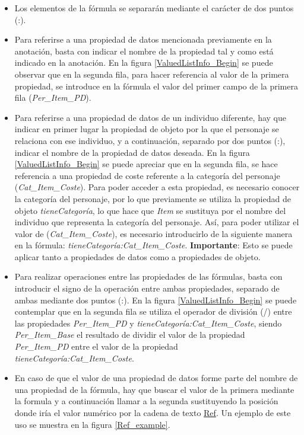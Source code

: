 \begin{itemize}
    \item Los elementos de la fórmula se separarán mediante el carácter de dos puntos (:).
    
    \item Para referirse a una propiedad de datos mencionada previamente en la anotación, basta con indicar el nombre de la 
    propiedad tal y como está indicado en la anotación. En la figura \ref*{ValuedListInfo_Begin} se puede observar que 
    en la segunda fila, para hacer referencia al valor de la primera propiedad, se introduce en la fórmula el valor del 
    primer campo de la primera fila (\textit{Per\_Item\_PD}).

    \item Para referirse a una propiedad de datos de un individuo diferente, hay que indicar en primer lugar la propiedad 
    de objeto por la que el personaje se relaciona con ese individuo, y a continuación, separado por dos puntos (:), indicar 
    el nombre de la propiedad de datos deseada. En la figura \ref*{ValuedListInfo_Begin} se puede apreciar que en la segunda 
    fila, se hace referencia a una propiedad de coste referente a la categoría del personaje (\textit{Cat\_Item\_Coste}).
    Para poder acceder a esta propiedad, es necesario conocer la categoría del personaje, por lo que previamente se utiliza 
    la propiedad de objeto \textit{tieneCategoría}, lo que hace que \textit{Item} se sustituya por el nombre del individuo que 
    representa la categoría del personaje. Así, para poder utilizar el valor de (\textit{Cat\_Item\_Coste}), es necesario introducirlo 
    de la siguiente manera en la fórmula: \textit{tieneCategoría:Cat\_Item\_Coste}. \textbf{Importante}: Esto se puede aplicar tanto 
    a propiedades de datos como a propiedades de objeto.

    \item Para realizar operaciones entre las propiedades de las fórmulas, basta con introducir el signo de la operación entre ambas 
    propiedades, separado de ambas mediante dos puntos (:). En la figura \ref*{ValuedListInfo_Begin} se puede contemplar que en la 
    segunda fila se utiliza el operador de división (/) entre las propiedades \textit{Per\_Item\_PD} y 
    \textit{tieneCategoría:Cat\_Item\_Coste}, siendo \textit{Per\_Item\_Base} el resultado de dividir el valor de la propiedad 
    \textit{Per\_Item\_PD} entre el valor de la propiedad \textit{tieneCategoría:Cat\_Item\_Coste}.

    \item En caso de que el valor de una propiedad de datos forme parte del nombre de una propiedad de la fórmula, hay que 
    buscar el valor de la primera mediante la formula y a continuación llamar a la segunda sustituyendo la posición donde 
    iría el valor numérico por la cadena de texto \underline{Ref}. Un ejemplo de este uso se muestra en la figura \ref*{Ref_example}.


\end{itemize}
